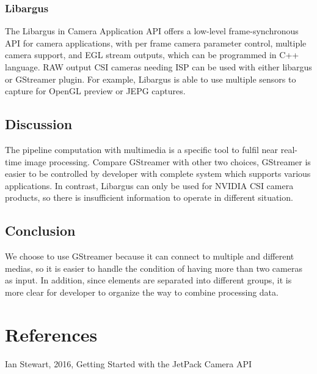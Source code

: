 \documentclass[letterpaper,10pt,serif,draftclsnofoot,onecolumn,compsoc,titlepage]{IEEEtran}
\begin{document}
\subsubsection{Libargus}
The Libargus in Camera Application API offers a low-level frame-synchronous API for camera 
applications, with per frame camera parameter control, multiple camera support, and EGL stream 
outputs, which can be programmed in C++ language. RAW output CSI cameras needing ISP can be used 
with either libargus or GStreamer plugin. For example, Libargus is able to use multiple sensors 
to capture for OpenGL preview or JEPG captures.\\

\subsection{Discussion}
The pipeline computation with multimedia is a specific tool to fulfil near real-time image 
processing. Compare GStreamer with other two choices, GStreamer is easier to be controlled by 
developer with complete system which supports various applications. In contrast, Libargus can 
only be used for NVIDIA CSI camera products, so there is insufficient information to operate in 
different situation.\\

\subsection{Conclusion}
We choose to use GStreamer because it can connect to multiple and different medias, so it is 
easier to handle the condition of having more than two cameras as input. In addition, since 
elements are separated into different groups, it is more clear for developer to organize the 
way to combine processing data.\\



\section{References}
Ian Stewart, 2016, Getting Started with the JetPack Camera API\\
\end{document}
